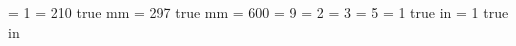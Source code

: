 \pdfoutput           = 1
\pdfpagewidth        = 210 true mm
\pdfpageheight       = 297 true mm
\pdfpkresolution     = 600
\pdfcompresslevel    = 9
\pdfobjcompresslevel = 2
\pdfdecimaldigits    = 3
\pdfminorversion     = 5
\pdfhorigin          = 1 true in
\pdfvorigin          = 1 true in
\endinput
